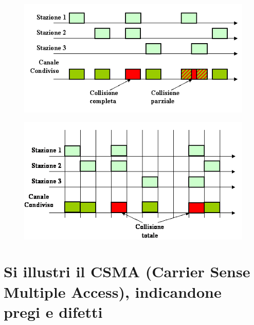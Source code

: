 \begin{figure}[H]
\centering
\includegraphics[scale=0.7]{res/img/22_ALOHA.png}
\end{figure}
\begin{figure}[H]
\centering
\includegraphics[scale=0.7]{res/img/22_ALOHASLOTTED.png}
\end{figure}

\section{Si illustri il CSMA (Carrier Sense Multiple Access), indicandone pregi e difetti}

